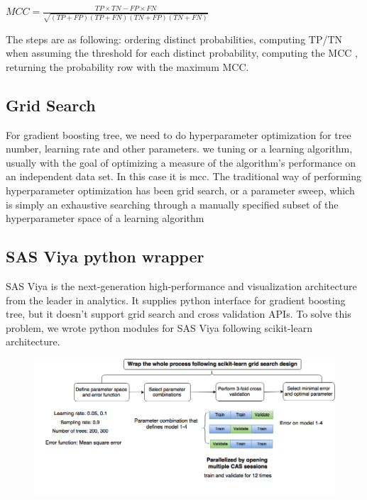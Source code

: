 \documentclass{article}
\begin{document}
$MCC =\frac{TP \times TN-FP\times FN}{\sqrt{(TP+FP)(TP+FN)(TN+FP)(TN+FN)}}$

The steps are as following: ordering distinct probabilities, computing TP/TN when assuming the threshold for each distinct probability, computing the MCC
, returning the probability row with the maximum MCC.

\subsection{Grid Search}
For gradient boosting tree, we need to do hyperparameter optimization for tree number, learning rate and other parameters. we tuning or a learning algorithm, usually with the goal of optimizing a measure of the algorithm's performance on an independent data set. In this case it is mcc.  The traditional way of performing hyperparameter optimization has been grid search, or a parameter sweep, which is simply an exhaustive searching through a manually specified subset of the hyperparameter space of a learning algorithm


\subsection{SAS Viya python wrapper}
SAS Viya is the next-generation high-performance and visualization architecture from the leader in analytics. It supplies python interface for gradient boosting tree, but it doesn't support grid search and cross validation APIs. To solve this problem, we wrote python modules for SAS Viya following scikit-learn architecture.
\begin{figure}[h]
\includegraphics[width=12.5cm]{HyperparameterOptimization.png}
\end{figure}


\end{document}
